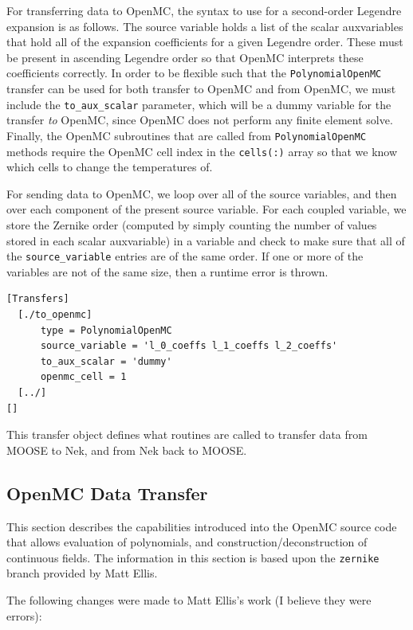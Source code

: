 \documentclass[10pt]{article}
\newcounter{subsubsubsection}[subsubsection]
\numberwithin{equation}{section} %
\begin{document}
For transferring data to OpenMC, the syntax to use for a second-order Legendre expansion is as follows. The source variable holds a list of the scalar auxvariables that hold all of the expansion coefficients for a given Legendre order. These must be present in ascending Legendre order so that OpenMC interprets these coefficients correctly. In order to be flexible such that the {\tt PolynomialOpenMC} transfer can be used for both transfer to OpenMC and from OpenMC, we must include the {\tt to\_aux\_scalar} parameter, which will be a dummy variable for the transfer {\it to} OpenMC, since OpenMC does not perform any finite element solve. Finally, the OpenMC subroutines that are called from {\tt PolynomialOpenMC} methods require the OpenMC cell index in the {\tt cells(:)} array so that we know which cells to change the temperatures of. 

For sending data to OpenMC, we loop over all of the source variables, and then over each component of the present source variable. For each coupled variable, we store the Zernike order (computed by simply counting the number of values stored in each scalar auxvariable) in a variable and check to make sure that all of the {\tt source\_variable} entries are of the same order. If one or more of the variables are not of the same size, then a runtime error is thrown. 

\begin{lstlisting}
[Transfers]
  [./to_openmc]
      type = PolynomialOpenMC
      source_variable = 'l_0_coeffs l_1_coeffs l_2_coeffs'
      to_aux_scalar = 'dummy'
      openmc_cell = 1
  [../]
[]
\end{lstlisting}

This transfer object defines what routines are called to transfer data from MOOSE to Nek, and from Nek back to MOOSE.

\subsection{OpenMC Data Transfer}
This section describes the capabilities introduced into the OpenMC source code that allows evaluation of polynomials, and construction/deconstruction of continuous fields. The information in this section is based upon the {\tt zernike} branch provided by Matt Ellis. 

The following changes were made to Matt Ellis's work (I believe they were errors):
\end{document}
